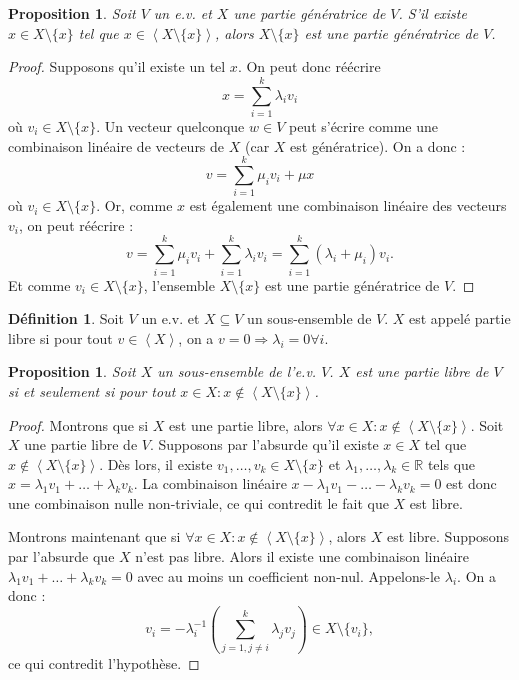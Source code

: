 \documentclass{article}
\newcommand{\R}{\mathbb R}
\newcommand{\eng}[1]{\left\langle#1\right\rangle}
\newtheorem{prp}[thm]{Proposition}
\theoremstyle{definition}
\newtheorem{déf}[thm]{Définition}
\theoremstyle{remark}
\begin{document}
		\begin{prp} Soit $V$ un e.v. et $X$ une partie génératrice de $V$. S'il existe $x \in X \setminus \{x\}$ tel que $x \in \eng {X \setminus \{x\}}$, alors
		$X \setminus \{x\}$ est une partie génératrice de $V$. \end{prp}

		\begin{proof} Supposons qu'il existe un tel $x$. On peut donc réécrire \[x = \sum_{i=1}^k\lambda_iv_i\] où $v_i \in X \setminus \{x\}$. Un vecteur quelconque
		$w \in V$ peut s'écrire comme une combinaison linéaire de vecteurs de $X$ (car $X$ est génératrice). On a donc : \[v = \sum_{i=1}^k\mu_iv_i + \mu x\] où
		$v_i \in X \setminus \{x\}$. Or, comme $x$ est également une combinaison linéaire des vecteurs $v_i$, on peut réécrire :
		\[v = \sum_{i=1}^k\mu_iv_i + \sum_{i=1}^k\lambda_iv_i = \sum_{i=1}^k(\lambda_i+\mu_i)v_i.\]
		Et comme $v_i \in X \setminus \{x\}$, l'ensemble $X \setminus \{x\}$ est une partie génératrice de $V$. \end{proof}

		\begin{déf} Soit $V$ un e.v. et $X \subseteq V$ un sous-ensemble de $V$. $X$ est appelé partie libre si pour tout $v \in \eng X$, on a
		$v = 0 \Rightarrow \lambda_i = 0 \forall i$. \end{déf}

		\begin{prp}\label{conditionsPartieLibre} Soit $X$ un sous-ensemble de l'e.v. $V$. $X$ est une partie libre de $V$ si et seulement si pour tout
		$x \in X : x \not \in \eng {X \setminus \{x\}}$. \end{prp}

		\begin{proof} Montrons que si $X$ est une partie libre, alors $\forall x \in X : x \not \in \eng {X \setminus \{x\}}$. Soit $X$ une partie libre de $V$.
		Supposons par l'absurde qu'il existe $x \in X$ tel que $x \not \in \eng {X \setminus \{x\}}$. Dès lors, il existe $v_1, \ldots, v_k \in X \setminus \{x\}$ et
		$\lambda_1, \ldots, \lambda_k \in \R$ tels que $x = \lambda_1v_1 + \ldots + \lambda_kv_k$. La combinaison linéaire $x - \lambda_1v_1 - \ldots - \lambda_kv_k = 0$
		est donc une combinaison nulle non-triviale, ce qui contredit le fait que $X$ est libre.

		Montrons maintenant que si $\forall x \in X : x \not \in \eng {X \setminus \{x\}}$, alors $X$ est libre. Supposons par l'absurde que $X$ n'est pas libre. Alors
		il existe une combinaison linéaire $\lambda_1v_1 + \ldots + \lambda_kv_k = 0$ avec au moins un coefficient non-nul. Appelons-le $\lambda_i$. On a donc :
		\[v_i = -\lambda_i^{-1}\left(\sum_{j=1, j \neq i}^k\lambda_jv_j\right) \in X \setminus \{v_i\},\] ce qui contredit l'hypothèse. \end{proof}
\end{document}
